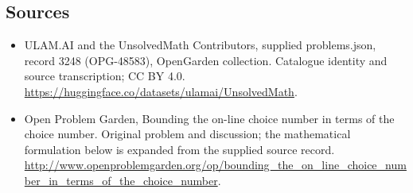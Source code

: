 \documentclass[11pt,a4paper]{article}
\begin{document}
\subsection{Sources}
\begin{itemize}
\item[S1] ULAM.AI and the UnsolvedMath Contributors, supplied problems.json, record 3248 (OPG-48583), OpenGarden collection. Catalogue identity and source transcription; CC BY 4.0.
\url{https://huggingface.co/datasets/ulamai/UnsolvedMath}.
\item[S2] Open Problem Garden, Bounding the on-line choice number in terms of the choice number. Original problem and discussion; the mathematical formulation below is expanded from the supplied source record.
\url{http://www.openproblemgarden.org/op/bounding_the_on_line_choice_number_in_terms_of_the_choice_number}.
\end{itemize}
\end{document}
